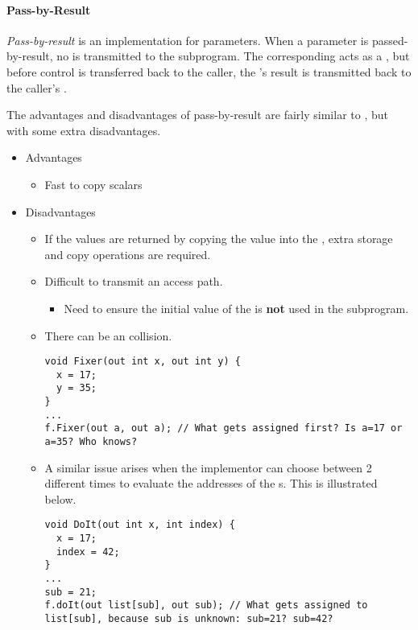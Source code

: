 \paragraph{Pass-by-Result}\label{par:Parameter_Passing-Pass_By_Result}
\begin{definition}\label{def:Pass_By_Result}
  \emph{Pass-by-result} is an implementation for  parameters.
  When a parameter is passed-by-result, no  is transmitted to the subprogram.
  The corresponding  acts as a , but before control is transferred back to the caller, the 's result is transmitted back to the caller's .

  The advantages and disadvantages of pass-by-result are fairly similar to , but with some extra disadvantages.
  \begin{itemize}[noitemsep]
  \item Advantages
    \begin{itemize}[noitemsep]
    \item Fast to copy scalars
    \end{itemize}
  \item Disadvantages
    \begin{itemize}[noitemsep]
    \item If the values are returned by copying the value into the , extra storage and copy operations are required.
    \item Difficult to transmit an access path.
      \begin{itemize}[noitemsep]
      \item Need to ensure the initial value of the  is \textbf{not} used in the subprogram.
      \end{itemize}
    \item There can be an  collision.
\begin{verbatim}
void Fixer(out int x, out int y) {
  x = 17;
  y = 35;
}
...
f.Fixer(out a, out a); // What gets assigned first? Is a=17 or a=35? Who knows?
\end{verbatim}
    \item A similar issue arises when the implementor can choose between 2 different times to evaluate the addresses of the s. This is illustrated below.
\begin{verbatim}
void DoIt(out int x, int index) {
  x = 17;
  index = 42;
}
...
sub = 21;
f.doIt(out list[sub], out sub); // What gets assigned to list[sub], because sub is unknown: sub=21? sub=42?
\end{verbatim}
    \end{itemize}
  \end{itemize}
\end{definition}

